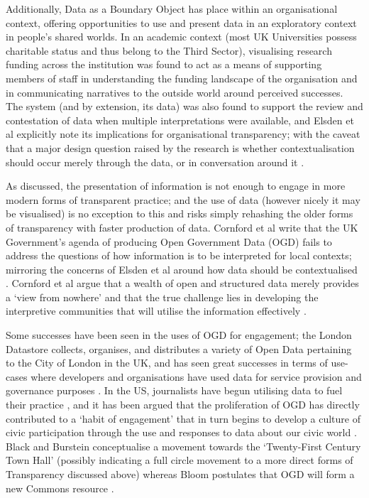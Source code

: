 Additionally, Data as a Boundary Object has place within an organisational context, offering opportunities to use and present data in an exploratory context in people's shared worlds. In an academic context (most UK Universities possess charitable status and thus belong to the Third Sector), visualising research funding across the institution was found to act as a means of supporting members of staff in understanding the funding landscape of the organisation and in communicating narratives to the outside world around perceived successes. The system (and by extension, its data) was also found to support the review and contestation of data when multiple interpretations were available, and Elsden et al explicitly note its implications for organisational transparency; with the caveat that a major design question raised by the research is whether contextualisation should occur merely through the data, or in conversation around it \cite{elsden_resviz:_2016}.

As discussed, the presentation of information is not enough to engage in more modern forms of transparent practice; and the use of data (however nicely it may be visualised) is no exception to this and risks simply rehashing the older forms of transparency with faster production of data. Cornford et al write that the UK Government's agenda of producing Open Government Data (OGD) fails to address the questions of how information is to be interpreted for local contexts; mirroring the concerns of Elsden et al around how data should be contextualised \cite{cornford_local_2013}. Cornford et al argue that a wealth of open and structured data merely provides a `view from nowhere' and that the true challenge lies in developing the interpretive communities that will utilise the information effectively \cite{cornford_local_2013}.

Some successes have been seen in the uses of OGD for engagement; the London Datastore \cite{noauthor_london_nodate} collects, organises, and distributes a variety of Open Data pertaining to the City of London in the UK, and has seen great successes in terms of use-cases where developers and organisations have used data for service provision and governance purposes \cite{coleman_lessons_2013}. In the US, journalists have begun utilising data to fuel their practice \cite{ramos_journalists_2013}, and it has been argued that the proliferation of OGD has directly contributed to a `habit of engagement' that in turn begins to develop a culture of civic participation through the use and responses to data about our civic world \cite{gordon_making_2013}. Black and Burstein conceptualise a movement towards the `Twenty-First Century Town Hall' \cite{black_local_2013} (possibly indicating a full circle movement to a more direct forms of Transparency discussed above) whereas Bloom postulates that OGD will form a new Commons resource \cite{bloom_towards_2013}.

